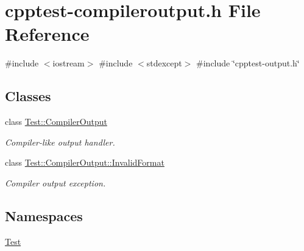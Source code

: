 \hypertarget{cpptest-compileroutput_8h}{}\section{cpptest-\/compileroutput.h File Reference}
\label{cpptest-compileroutput_8h}
{\ttfamily \#include $<$iostream$>$}\newline
{\ttfamily \#include $<$stdexcept$>$}\newline
{\ttfamily \#include \char`\"{}cpptest-\/output.\+h\char`\"{}}\newline
\subsection*{Classes}
\begin{DoxyCompactItemize}
\item 
class \mbox{\hyperlink{class_test_1_1_compiler_output}{Test\+::\+Compiler\+Output}}
\begin{DoxyCompactList}\small\item\em Compiler-\/like output handler. \end{DoxyCompactList}\item 
class \mbox{\hyperlink{class_test_1_1_compiler_output_1_1_invalid_format}{Test\+::\+Compiler\+Output\+::\+Invalid\+Format}}
\begin{DoxyCompactList}\small\item\em Compiler output exception. \end{DoxyCompactList}\end{DoxyCompactItemize}
\subsection*{Namespaces}
\begin{DoxyCompactItemize}
\item 
 \mbox{\hyperlink{namespace_test}{Test}}
\end{DoxyCompactItemize}
